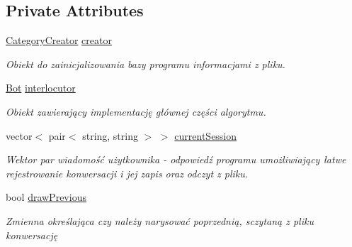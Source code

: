 \subsection*{Private Attributes}
\begin{DoxyCompactItemize}
\item 
\mbox{\label{class_convo_manager_a4ff5e19893c742be5bc6952b6a5fcc84}} 
\mbox{\hyperlink{class_category_creator}{Category\+Creator}} \mbox{\hyperlink{class_convo_manager_a4ff5e19893c742be5bc6952b6a5fcc84}{creator}}
\begin{DoxyCompactList}\small\item\em Obiekt do zainicjalizowania bazy programu informacjami z pliku. \end{DoxyCompactList}\item 
\mbox{\label{class_convo_manager_aa82d86cae957b96cf858939d18196749}} 
\mbox{\hyperlink{class_bot}{Bot}} \mbox{\hyperlink{class_convo_manager_aa82d86cae957b96cf858939d18196749}{interlocutor}}
\begin{DoxyCompactList}\small\item\em Obiekt zawierający implementację głównej części algorytmu. \end{DoxyCompactList}\item 
\mbox{\label{class_convo_manager_a875a3812a849e95379cd0961d7613ec2}} 
vector$<$ pair$<$ string, string $>$ $>$ \mbox{\hyperlink{class_convo_manager_a875a3812a849e95379cd0961d7613ec2}{current\+Session}}
\begin{DoxyCompactList}\small\item\em Wektor par wiadomość użytkownika -\/ odpowiedź programu umożliwiający łatwe rejestrowanie konwersacji i jej zapis oraz odczyt z pliku. \end{DoxyCompactList}\item 
\mbox{\label{class_convo_manager_a68546f29235ef3ce628cbae588164728}} 
bool \mbox{\hyperlink{class_convo_manager_a68546f29235ef3ce628cbae588164728}{draw\+Previous}}
\begin{DoxyCompactList}\small\item\em Zmienna określająca czy należy narysować poprzednią, sczytaną z pliku konwersację \end{DoxyCompactList}\end{DoxyCompactItemize}


